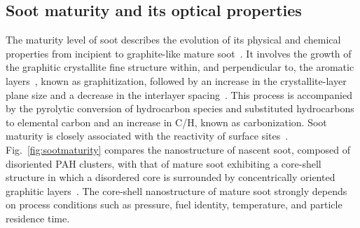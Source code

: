 
\subsection{Soot maturity and its optical properties}
The maturity level of soot describes the evolution of its physical and chemical properties from incipient to graphite-like mature soot~\citep{michelsen2017probing}. It involves the growth of the graphitic crystallite fine structure within, and perpendicular to, the aromatic layers~\citep{franklin1951crystallite, haynes1981soot}, known as graphitization, followed by an increase in the crystallite-layer plane size and a decrease in the interlayer spacing~\citep{alfe2009structure}. This process is accompanied by the pyrolytic conversion of hydrocarbon species and substituted hydrocarbons to elemental carbon and an increase in C/H, known as carbonization. Soot maturity is closely associated with the reactivity of surface sites~\citep{camacho2015kinetics}. Fig.~\ref{fig:sootmaturity} compares the nanostructure of nascent soot, composed of disoriented PAH clusters, with that of mature soot exhibiting a core-shell structure in which a disordered core is surrounded by concentrically oriented graphitic layers~\citep{happold2009soot}. The core-shell nanostructure of mature soot strongly depends on process conditions such as pressure, fuel identity, temperature, and particle residence time.




